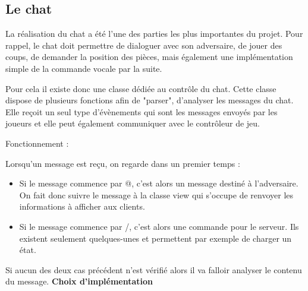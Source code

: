 \documentclass[12pt, openany]{report}
\begin{document}
\subsection{Le chat}

La réalisation du chat a été l'une des parties les plus importantes du projet.
Pour rappel, le chat doit permettre de dialoguer avec son adversaire, de jouer des coups, de demander la position des pièces, mais également une implémentation simple de la commande vocale par la suite.

Pour cela il existe donc une classe dédiée au contrôle du chat. Cette classe dispose de plusieurs fonctions afin de "parser", d'analyser les messages du chat. Elle reçoit un seul type d'évènements qui sont les messages envoyés par les joueurs et elle peut également communiquer avec le contrôleur de jeu.

Fonctionnement :

Lorsqu'un message est reçu, on regarde dans un premier temps :
\begin{itemize}
    \item Si le message commence par @, c'est alors un message destiné à l'adversaire. On fait donc suivre le message à la classe view qui s'occupe de renvoyer les informations à afficher aux clients.
    \item Si le message commence par /, c'est alors une commande pour le serveur. Ils existent seulement quelques-unes et permettent par exemple de charger un état.
\end{itemize}

Si aucun des deux cas précédent n'est vérifié alors il va falloir analyser le contenu du message.
\newline\newline
\textbf{Choix d'implémentation}
\end{document}
